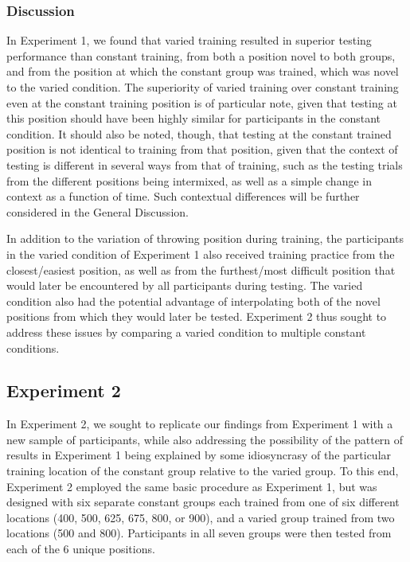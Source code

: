 \documentclass[
  11pt,
  letterpaper,
]{article}
\begin{document}
\subsubsection{Discussion}\label{discussion}

In Experiment 1, we found that varied training resulted in superior
testing performance than constant training, from both a position novel
to both groups, and from the position at which the constant group was
trained, which was novel to the varied condition. The superiority of
varied training over constant training even at the constant training
position is of particular note, given that testing at this position
should have been highly similar for participants in the constant
condition. It should also be noted, though, that testing at the constant
trained position is not identical to training from that position, given
that the context of testing is different in several ways from that of
training, such as the testing trials from the different positions being
intermixed, as well as a simple change in context as a function of time.
Such contextual differences will be further considered in the General
Discussion.

In addition to the variation of throwing position during training, the
participants in the varied condition of Experiment 1 also received
training practice from the closest/easiest position, as well as from the
furthest/most difficult position that would later be encountered by all
participants during testing. The varied condition also had the potential
advantage of interpolating both of the novel positions from which they
would later be tested. Experiment 2 thus sought to address these issues
by comparing a varied condition to multiple constant conditions.

\subsection{Experiment 2}\label{experiment-2}

In Experiment 2, we sought to replicate our findings from Experiment 1
with a new sample of participants, while also addressing the possibility
of the pattern of results in Experiment 1 being explained by some
idiosyncrasy of the particular training location of the constant group
relative to the varied group. To this end, Experiment 2 employed the
same basic procedure as Experiment 1, but was designed with six separate
constant groups each trained from one of six different locations (400,
500, 625, 675, 800, or 900), and a varied group trained from two
locations (500 and 800). Participants in all seven groups were then
tested from each of the 6 unique positions.
\end{document}
